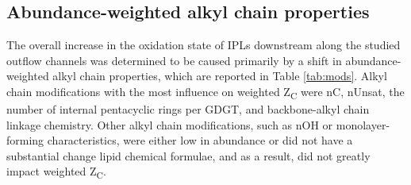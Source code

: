 


\subsection{Abundance-weighted alkyl chain properties}
The overall increase in the oxidation state of IPLs downstream along the studied outflow channels was determined to be caused primarily by a shift in abundance-weighted alkyl chain properties, which are reported in Table \ref{tab:mods}. Alkyl chain modifications with the most influence on weighted Z\textsubscript{C} were nC, nUnsat, the number of internal pentacyclic rings per GDGT, and backbone-alkyl chain linkage chemistry. Other alkyl chain modifications, such as nOH or monolayer-forming characteristics, were either low in abundance or did not have a substantial change lipid chemical formulae, and as a result, did not greatly impact weighted Z\textsubscript{C}.


